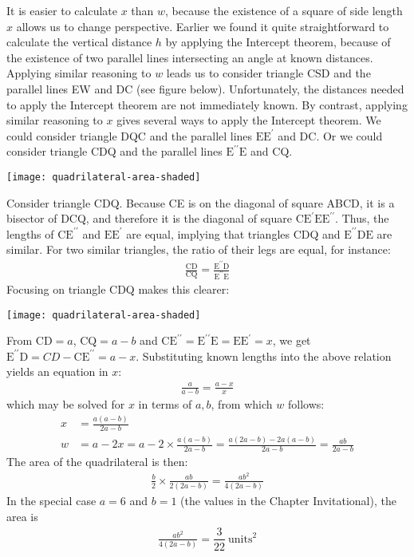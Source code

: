\documentclass[12pt]{article}
\begin{document}
\begin{answer}
It is easier to calculate $x$ than $w$, because the existence of a square of side length $x$ allows us to change perspective. Earlier we found it quite straightforward to calculate the vertical distance $h$ by applying the Intercept theorem, because of the existence of two parallel lines intersecting an angle at known distances. Applying similar reasoning to $w$ leads us to consider triangle CSD and the parallel lines EW and DC (see figure below). Unfortunately, the distances needed to apply the Intercept theorem are not immediately known. By contrast, applying similar reasoning to $x$ gives several ways to apply the Intercept theorem. We could consider triangle DQC and the parallel lines $\text{E}\text{E}^{\prime}$ and DC. Or we could consider triangle CDQ and the parallel lines $\text{E}^{\prime\prime}\text{E}$ and CQ. 

\begin{center}
\texttt{[image: quadrilateral-area-shaded]}
\end{center} 

Consider triangle CDQ. Because CE is on the diagonal of square ABCD, it is a bisector of DCQ, and therefore it is the diagonal of square $\text{C}\text{E}^{\prime}\text{E}\text{E}^{\prime\prime}$. Thus, the lengths of $\text{C}\text{E}^{\prime\prime}$ and $\text{E}\text{E}^{\prime}$ are equal, implying that triangles CDQ and  $\text{E}^{\prime\prime}\text{D}\text{E}$ are similar. For two similar triangles, the ratio of their legs are equal, for instance:
\begin{align*}
\frac{\text{C}\text{D}}{\text{C}\text{Q}} 
= \frac{\text{E}^{\prime\prime}\text{D}}{\text{E}^{\prime\prime}\text{E}}  
\end{align*}
Focusing on triangle CDQ makes this clearer:
\begin{center}
\texttt{[image: quadrilateral-area-shaded]}
\end{center}
From $\text{CD}=a$, $\text{CQ}=a-b$ and   $\text{C}\text{E}^{\prime\prime}=\text{E}^{\prime\prime}\text{E}=\text{E}\text{E}^{\prime}=x$, we get $\text{E}^{\prime\prime}\text{D}=CD-\text{C}\text{E}^{\prime\prime}=a-x$. Substituting known lengths into the above relation yields an equation in $x$:
\begin{align*}
\frac{a}{a-b} = \frac{a-x}{x} 
\end{align*}
which may be solved for $x$ in terms of $a,b$, from which $w$ follows: 
\begin{align*}
x & = \frac{a(a-b)}{2a-b} \\
w & = a - 2x 
    = a - 2 \times \frac{a(a-b)}{2a-b} 
    = \frac{a(2a-b)-2a(a-b)}{2a-b}
    = \frac{ab}{2a-b}
\end{align*}
The area of the quadrilateral is then:
\begin{align*}
\frac{b}{2} \times \frac{ab}{2(2a-b)}
  = \frac{ab^2}{4(2a-b)}
\end{align*}
In the special case $a=6$ and $b=1$ (the values in the Chapter Invitational), the area is
\begin{align*}
\frac{ab^2}{4(2a-b)}
 = \dfrac{3}{22}~\text{units}^{2}
\end{align*}


\end{answer}
\end{document}
